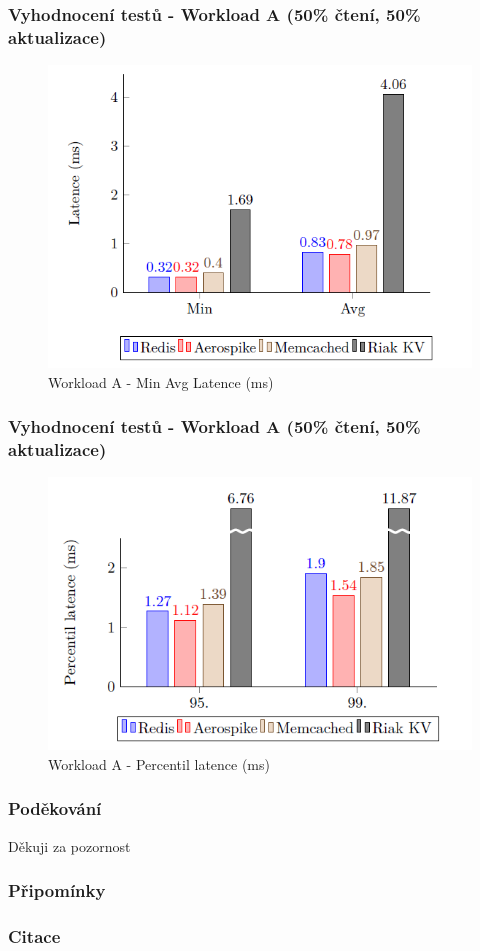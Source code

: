 \documentclass{beamer}
\begin{document}
	\begin{frame}
		\frametitle{Vyhodnocení testů - Workload A (50\% čtení, 50\% aktualizace)}
		\begin{figure}
			\centering
			\includegraphics[scale=0.5]{Figures/graf_wa_min_avg.PNG}
			\caption{Workload A - Min Avg Latence (ms)}
		\end{figure}
	\end{frame}

	\begin{frame}
		\frametitle{Vyhodnocení testů - Workload A (50\% čtení, 50\% aktualizace)}
		\begin{figure}
			\centering
			\includegraphics[scale=0.5]{Figures/graf_perc.PNG}
			\caption{Workload A - Percentil latence (ms)}
		\end{figure}
	\end{frame}
	
	\begin{frame}
		\frametitle{Poděkování}
		
		\begin{center}
			\Huge
			Děkuji za pozornost
		\end{center}
		
	\end{frame}

	\begin{frame}
		\frametitle{Připomínky}
		
	\end{frame}

	\begin{frame}
		\frametitle{Citace}
		
		\printbibliography
		
	\end{frame}
	
\end{document}
